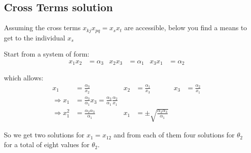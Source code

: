 \documentclass[
	english,
	a4paper,
	fontsize=10pt,
	parskip=half,
	titlepage=true,
	DIV=12,
	final
]{scrreprt}
\newcommand*{\Thus}{\ensuremath{\Rightarrow}\xspace}
\begin{document}
\subsection{Cross Terms solution}
{\color{blue} Assuming the cross terms $x_{kj} x_{pq} = x_s x_t$ are accessible, below you find a means to get to the individual $x_s$}

Start from a system of form:
\begin{align}
	x_1 x_2 &= \alpha_3 &
	x_2 x_3 &= \alpha_1 &
	x_3 x_1 &= \alpha_2
\end{align}

which allows:
\begin{align}
	x_1 &= \frac{\alpha_3}{x_2} &
	x_2 &= \frac{\alpha_1}{x_3} &
	x_3 &= \frac{\alpha_2}{x_1}
\\
	\Thus
	x_1 &= \frac{\alpha_3}{\alpha_1} x_3 = \frac{\alpha_3}{\alpha_1} \frac{\alpha_2}{x_1}
\\
	\Thus
	x_1^2 &= \frac{\alpha_2 \alpha_3}{\alpha_1} &
	x_1 &= \pm \sqrt{\frac{\alpha_2 \alpha_3}{\alpha_1}}
\end{align}

So we get two solutions for $x_1 = x_{12}$ and from each of them four solutions for $\theta_2$ for a total of eight values for $\theta_2$.
\end{document}
